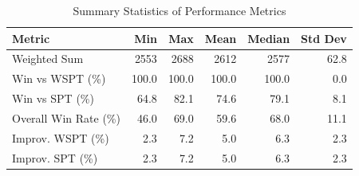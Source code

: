 \begin{table}[htbp]%
\centering%
\begin{tabular}{lrrrrr}%
\toprule%
\textbf{Metric}&\textbf{Min}&\textbf{Max}&\textbf{Mean}&\textbf{Median}&\textbf{Std Dev}\\%
\midrule%
Weighted Sum&2553&2688&2612&2577&62.8\\%
Win vs WSPT (\%)&100.0&100.0&100.0&100.0&0.0\\%
Win vs SPT (\%)&64.8&82.1&74.6&79.1&8.1\\%
Overall Win Rate (\%)&46.0&69.0&59.6&68.0&11.1\\%
Improv. WSPT (\%)&2.3&7.2&5.0&6.3&2.3\\%
Improv. SPT (\%)&2.3&7.2&5.0&6.3&2.3\\%
\bottomrule%
\end{tabular}%
\caption{Summary Statistics of Performance Metrics}%
\label{tab:metrics}%
\end{table}